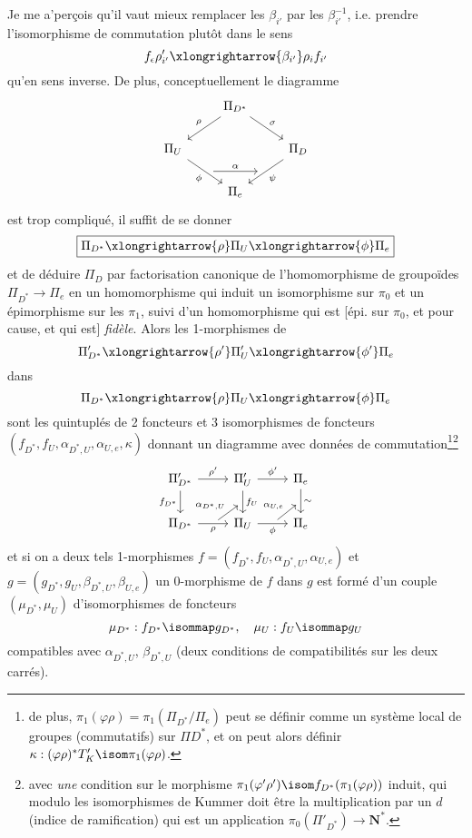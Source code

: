 Je me a'per\c{c}ois qu'il vaut mieux remplacer les $\beta_{i'}$ par les $\beta^{-1}_{i'}$, i.e. prendre l'isomorphisme de commutation plutôt dans le sens
$$
f_\epsilon \rho'_{i'} \xlongrightarrow{\beta_{i'}} \rho_i f_{i'}
$$
qu'en sens inverse. De plus, conceptuellement le diagramme
\[\begin{tikzcd}
	& {\Pi_{D^*}} \\
	{\Pi_U} && {\Pi_D} \\
	& {\Pi_e}
	\arrow[""{name=0, anchor=center, inner sep=0}, "\phi"', from=2-1, to=3-2]
	\arrow[""{name=1, anchor=center, inner sep=0}, "\psi", from=2-3, to=3-2]
	\arrow["\rho"', from=1-2, to=2-1]
	\arrow["\sigma", from=1-2, to=2-3]
	\arrow["\alpha", shorten <=6pt, shorten >=6pt, from=0, to=1]
\end{tikzcd}\]
est trop compliqué, il suffit de se donner
$$
\boxed{\Pi_{D^*} \xlongrightarrow{\rho} \Pi_U \xlongrightarrow{\phi} \Pi_e}
$$
et de déduire $\Pi_D$ par factorisation canonique de l'homomorphisme de groupoïdes $\Pi_{D^*} \to \Pi_e$ en un homomorphisme qui induit un isomorphisme sur $\pi_0$ et un épimorphisme sur les $\pi_1$, suivi d'un homomorphisme qui est [épi. sur $\pi_0$, et pour cause, et qui est] \emph{fidèle}. Alors les 1-morphismes de
$$
\Pi'_{D^*} \xlongrightarrow{\rho'} \Pi'_U \xlongrightarrow{\phi'} \Pi_e
$$
dans
$$
\Pi_{D^*} \xlongrightarrow{\rho} \Pi_U \xlongrightarrow{\phi} \Pi_e
$$
sont les quintuplés de 2 foncteurs et 3 isomorphismes de foncteurs $(f_{D^*}, f_U, \alpha_{D^*, U}, \alpha_{U, e}, \kappa)$ donnant un diagramme avec données de commutation\footnote{de plus, $\pi_1(\varphi \rho) = \pi_1(\Pi_{D^*}/\Pi_e)$ peut se définir comme un système local de groupes (commutatifs) sur $\Pi{D^*}$, et on peut alors définir $\kappa: (\varphi \rho)^* T'_K \isom \pi_1(\varphi \rho)$.}\footnote{avec \emph{une} condition sur le morphisme $\pi_1(\varphi' \rho') \isom f_{D^*}(\pi_1(\varphi \rho))$ induit, qui modulo les isomorphismes de Kummer doit être la multiplication par un $d$ (indice de ramification) qui est un application $\pi_0(\Pi'_{D^*}) \to \mathbf{N}^*$.} 
\[\begin{tikzcd}
	{\Pi'_{D^*}} & {\Pi'_U} & {\Pi_e} \\
	{\Pi_{D^*}} & {\Pi_U} & {\Pi_e}
	\arrow[""{name=0, anchor=center, inner sep=0}, "\sim", from=1-3, to=2-3]
	\arrow["{\phi'}", from=1-2, to=1-3]
	\arrow["{\rho'}", from=1-1, to=1-2]
	\arrow["{f_{D^*}}"', from=1-1, to=2-1]
	\arrow[""{name=1, anchor=center, inner sep=0}, "{f_U}", from=1-2, to=2-2]
	\arrow[""{name=2, anchor=center, inner sep=0}, "\rho"', from=2-1, to=2-2]
	\arrow[""{name=3, anchor=center, inner sep=0}, "\phi"', from=2-2, to=2-3]
	\arrow["{\alpha_{D^*, U}}", shorten <=4pt, shorten >=4pt, from=2, to=1]
	\arrow["{\alpha_{U, e}}", shorten <=4pt, shorten >=4pt, from=3, to=0]
\end{tikzcd}\]
et si on a deux tels 1-morphismes $f = (f_{D^*}, f_U, \alpha_{D^*, U}, \alpha_{U, e})$ et $g = (g_{D^*}, g_U, \beta_{D^*, U}, \beta_{U, e})$ un 0-morphisme de $f$ dans $g$ est formé d'un couple $(\mu_{D^*}, \mu_U)$ d'isomorphismes de foncteurs
$$
\mu_{D^*}: f_{D^*} \isommap g_{D^*}, \quad \mu_U: f_U \isommap g_U
$$
compatibles avec $\alpha_{D^*, U}$, $\beta_{D^*, U}$ (deux conditions de compatibilités sur les deux carrés).


